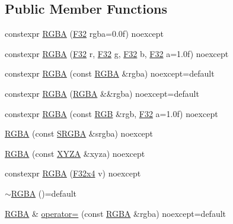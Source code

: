 \subsection*{Public Member Functions}
\begin{DoxyCompactItemize}
\item 
constexpr \mbox{\hyperlink{structmage_1_1_r_g_b_a_afe334e4408a71e808b8cf0bc9dd06dde}{R\+G\+BA}} (\mbox{\hyperlink{namespacemage_aa97e833b45f06d60a0a9c4fc22ae02c0}{F32}} rgba=0.\+0f) noexcept
\item 
constexpr \mbox{\hyperlink{structmage_1_1_r_g_b_a_a12ae339b8bcae0a1c0aacad280963ade}{R\+G\+BA}} (\mbox{\hyperlink{namespacemage_aa97e833b45f06d60a0a9c4fc22ae02c0}{F32}} r, \mbox{\hyperlink{namespacemage_aa97e833b45f06d60a0a9c4fc22ae02c0}{F32}} g, \mbox{\hyperlink{namespacemage_aa97e833b45f06d60a0a9c4fc22ae02c0}{F32}} b, \mbox{\hyperlink{namespacemage_aa97e833b45f06d60a0a9c4fc22ae02c0}{F32}} a=1.\+0f) noexcept
\item 
constexpr \mbox{\hyperlink{structmage_1_1_r_g_b_a_ad399faf871c1dec0ee3c4c0eb89329df}{R\+G\+BA}} (const \mbox{\hyperlink{structmage_1_1_r_g_b_a}{R\+G\+BA}} \&rgba) noexcept=default
\item 
constexpr \mbox{\hyperlink{structmage_1_1_r_g_b_a_a931063ef190241d875856430aa9fbac9}{R\+G\+BA}} (\mbox{\hyperlink{structmage_1_1_r_g_b_a}{R\+G\+BA}} \&\&rgba) noexcept=default
\item 
constexpr \mbox{\hyperlink{structmage_1_1_r_g_b_a_ad766984007f021cdde26f63436d90825}{R\+G\+BA}} (const \mbox{\hyperlink{structmage_1_1_r_g_b}{R\+GB}} \&rgb, \mbox{\hyperlink{namespacemage_aa97e833b45f06d60a0a9c4fc22ae02c0}{F32}} a=1.\+0f) noexcept
\item 
\mbox{\hyperlink{structmage_1_1_r_g_b_a_a82b256781126a25fd7a9a84a75fffb90}{R\+G\+BA}} (const \mbox{\hyperlink{structmage_1_1_s_r_g_b_a}{S\+R\+G\+BA}} \&srgba) noexcept
\item 
\mbox{\hyperlink{structmage_1_1_r_g_b_a_a008be57a6540fee8ed02d285681e3ed4}{R\+G\+BA}} (const \mbox{\hyperlink{structmage_1_1_x_y_z_a}{X\+Y\+ZA}} \&xyza) noexcept
\item 
constexpr \mbox{\hyperlink{structmage_1_1_r_g_b_a_a058e985bdbdf376616d1f6dd121d2dd8}{R\+G\+BA}} (\mbox{\hyperlink{namespacemage_a759aaad2fdc75aa93b5b614eb01712c4}{F32x4}} v) noexcept
\item 
\mbox{\hyperlink{structmage_1_1_r_g_b_a_a139a22381a3fb02d1f28be505b41c9df}{$\sim$\+R\+G\+BA}} ()=default
\item 
\mbox{\hyperlink{structmage_1_1_r_g_b_a}{R\+G\+BA}} \& \mbox{\hyperlink{structmage_1_1_r_g_b_a_a96b9f7d1b17cc68b8b0949eefe3d3e5c}{operator=}} (const \mbox{\hyperlink{structmage_1_1_r_g_b_a}{R\+G\+BA}} \&rgba) noexcept=default

\end{DoxyCompactItemize}
